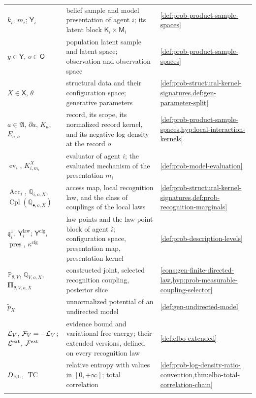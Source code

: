 {\begin{longtable}{@{}>{\raggedright\arraybackslash}p{}
>{\raggedright\arraybackslash}p{}
>{\raggedright\arraybackslash}p{}@{}}
$k_i$, $m_i$; $\mathsf Y_i$ & belief sample and model presentation of agent $i$; its latent block $\mathsf K_i\times\mathsf M_i$ & \cref{def:prob-product-sample-spaces} \\
$y\in\mathsf Y$, $o\in\mathsf O$ & population latent sample and latent space; observation and observation space & \cref{def:prob-product-sample-spaces} \\
$X\in\mathsf X$, $\theta$ & structural data and their configuration space; generative parameters & \cref{def:prob-structural-kernel-signatures,def:gen-parameter-split} \\
$a\in\mathfrak A$, $\partial a$, $K_a$, $E_{a,o}$ & record, its scope, its normalized record kernel, and its negative log density at the record $o$ & \cref{def:prob-product-sample-spaces,hyp:local-interaction-kernels} \\
$\operatorname{ev}_i$, $K^X_{i,m_i}$ & evaluator of agent $i$; the evaluated mechanism of the presentation $m_i$ & \cref{def:prob-model-evaluation} \\
$\operatorname{Acc}_i$, $\mathbb Q_{i,o,X}$, $\operatorname{Cpl}(\mathbb Q_{\bullet,o,X})$ & access map, local recognition law, and the class of couplings of the local laws & \cref{def:prob-structural-kernel-signatures,def:prob-recognition-marginals} \\
$\mathfrak q_i^x$, $\mathsf Y^{\mathrm{law}}_i$; $\mathsf Y^{\mathrm{cfg}}$, $\operatorname{pres}$, $\kappa^{\mathrm{cfg}}$ & law points and the law-point block of agent $i$; configuration space, presentation map, presentation kernel & \cref{def:prob-description-levels} \\
$\mathbb P_{\theta,V}$, $\mathbb Q_{V,o,X}$, $\boldsymbol\Pi_{\theta,V,o,X}$ & constructed joint, selected recognition coupling, posterior slice & \cref{cons:gen-finite-directed-law,hyp:prob-measurable-coupling-selector} \\
$\widetilde p_X$ & unnormalized potential of an undirected model & \cref{def:gen-undirected-model} \\
$\mathcal L_V$, $\mathcal F_V=-\mathcal L_V$; $\mathcal L^{\mathrm{ext}}$, $\mathcal F^{\mathrm{ext}}$ & evidence bound and variational free energy; their extended versions, defined on every recognition law & \cref{def:elbo-extended} \\
$D_{\mathrm{KL}}$, $\operatorname{TC}$ & relative entropy with values in $[0,+\infty]$; total correlation & \cref{def:prob-log-density-ratio-convention,thm:elbo-total-correlation-chain} \\
\multicolumn{3}{@{}l}{\textbf{Attention and selective communication}} \\

\end{longtable}}

